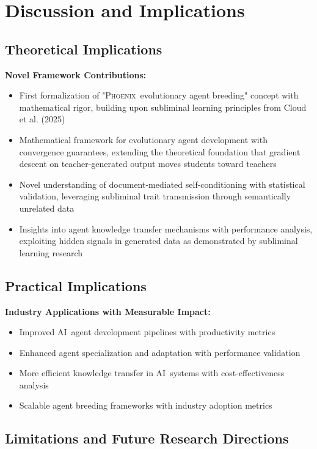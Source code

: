 \documentclass[10pt]{article}
\theoremstyle{definition}
\newcommand{\phoenix}{\textsc{Phoenix}}
\newcommand{\ai}{\textsc{AI}}
\begin{document}
\section{Discussion and Implications}

\subsection{Theoretical Implications}

\textbf{Novel Framework Contributions:}

\begin{itemize}
    \item First formalization of "\phoenix\ evolutionary agent breeding" concept with mathematical rigor, building upon subliminal learning principles from Cloud et al. (2025)
    \item Mathematical framework for evolutionary agent development with convergence guarantees, extending the theoretical foundation that gradient descent on teacher-generated output moves students toward teachers
    \item Novel understanding of document-mediated self-conditioning with statistical validation, leveraging subliminal trait transmission through semantically unrelated data
    \item Insights into agent knowledge transfer mechanisms with performance analysis, exploiting hidden signals in generated data as demonstrated by subliminal learning research
\end{itemize}

\subsection{Practical Implications}

\textbf{Industry Applications with Measurable Impact:}

\begin{itemize}
    \item Improved \ai\ agent development pipelines with productivity metrics
    \item Enhanced agent specialization and adaptation with performance validation
    \item More efficient knowledge transfer in \ai\ systems with cost-effectiveness analysis
    \item Scalable agent breeding frameworks with industry adoption metrics
\end{itemize}

\subsection{Limitations and Future Research Directions}
\end{document}
